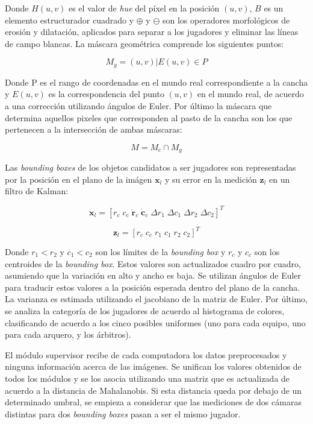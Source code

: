 \documentclass[a4paper,10pt]{article}
\begin{document}
Donde $H(u, v)$ es el valor de \textit{hue} del píxel en la posición $(u, v)$,
$B$ es un elemento estructurador cuadrado y $\oplus$ y $\ominus$ son los
operadores morfológicos de erosión y dilatación, aplicados para separar a los
jugadores y eliminar las líneas de campo blancas. La máscara geométrica
comprende los siguientes puntos:

\[
  M_g = { (u, v) | E(u, v)  \in P }
\]

Donde P es el rango de coordenadas en el mundo real correspondiente a la cancha
y $E(u, v)$ es la correspondencia del punto $(u, v)$ en el mundo real, de
acuerdo a una corrección utilizando ángulos de Euler. Por último la máscara que
determina aquellos pixeles que corresponden al pasto de la cancha son los que
pertenecen a la intersección de ambas máscaras:

\[
  M = M_c \cap M_g
\]

Las \textit{bounding boxes} de los objetos candidatos a ser jugadores son
representadas por la posición en el plano de la imágen $\mathbf{x}_l$ y su
error en la medición $\mathbf{z}_l$ en un filtro de Kalman:

\[
\mathbf{x}_l = [r_c \; c_c \;  \mathbf{\dot r}_c  \; \mathbf{\dot c}_c \;  \Delta r_1  \; \Delta c_1 \;  \Delta r_2 \;  \Delta c_2]^T
\]

\[
\mathbf{z}_l = [r_c \;  c_c  \; r_1  \; c_1  \; r_2  \; c_2]^T
\]

Donde $r_1 < r_2$ y $c_1 < c_2$ son los límites de la \textit{bounding box} y
$r_c$ y $c_c$ son los centroides de la \textit{bounding box}. Estos valores son
actualizados cuadro por cuadro, asumiendo que la variación en alto y ancho es
baja. Se utilizan ángulos de Euler para traducir estos valores a la posición
esperada dentro del plano de la cancha. La varianza es estimada utilizando el
jacobiano de la matriz de Euler. Por último, se analiza la categoría de los
jugadores de acuerdo al histograma de colores, clasificando de acuerdo a los
cinco posibles uniformes (uno para cada equipo, uno para cada arquero, y los
árbitros).

El módulo supervisor recibe de cada computadora los datos preprocesados y
ninguna información acerca de las imágenes. Se unifican los valores obtenidos
de todos los módulos y se los asocia utilizando una matriz que es actualizada
de acuerdo a la distancia de Mahalanobis. Si esta distancia queda por debajo de
un determinado umbral, se empieza a considerar que las mediciones de dos
cámaras distintas para dos \textit{bounding boxes} pasan a ser el mismo
jugador.
\end{document}
